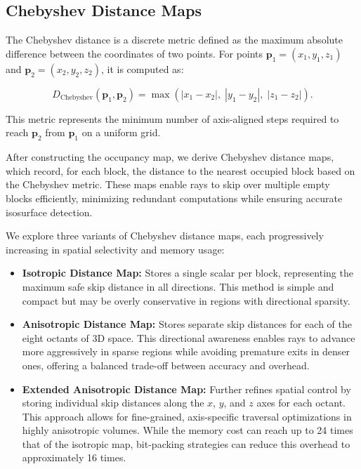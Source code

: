 \documentclass[conference]{IEEEtran}
\begin{document}
\subsection{Chebyshev Distance Maps}
The Chebyshev distance is a discrete metric defined as the maximum absolute difference between the coordinates of two points. For points $\mathbf{p}_1 = (x_1, y_1, z_1)$ and $\mathbf{p}_2 = (x_2, y_2, z_2)$, it is computed as:

\begin{equation}
D_{\text{Chebyshev}}(\mathbf{p}_1, \mathbf{p}_2) = \max \left( |x_1 - x_2|,\; |y_1 - y_2|,\; |z_1 - z_2| \right).
\end{equation}

This metric represents the minimum number of axis-aligned steps required to reach $\mathbf{p}_2$ from $\mathbf{p}_1$ on a uniform grid.

After constructing the occupancy map, we derive Chebyshev distance maps, which record, for each block, the distance to the nearest occupied block based on the Chebyshev metric. These maps enable rays to skip over multiple empty blocks efficiently, minimizing redundant computations while ensuring accurate isosurface detection.

We explore three variants of Chebyshev distance maps, each progressively increasing in spatial selectivity and memory usage:

\begin{itemize}
  \item \textbf{Isotropic Distance Map:} 
  Stores a single scalar per block, representing the maximum safe skip distance in all directions. This method is simple and compact but may be overly conservative in regions with directional sparsity.

 \item \textbf{Anisotropic Distance Map:} 
 Stores separate skip distances for each of the eight octants of 3D space. This directional awareness enables rays to advance more aggressively in sparse regions while avoiding premature exits in denser ones, offering a balanced trade-off between accuracy and overhead.
 
\item \textbf{Extended Anisotropic Distance Map:} 
Further refines spatial control by storing individual skip distances along the $x$, $y$, and $z$ axes for each octant. This approach allows for fine-grained, axis-specific traversal optimizations in highly anisotropic volumes. While the memory cost can reach up to 24 times that of the isotropic map, bit-packing strategies can reduce this overhead to approximately 16 times.

\end{itemize}
\end{document}
